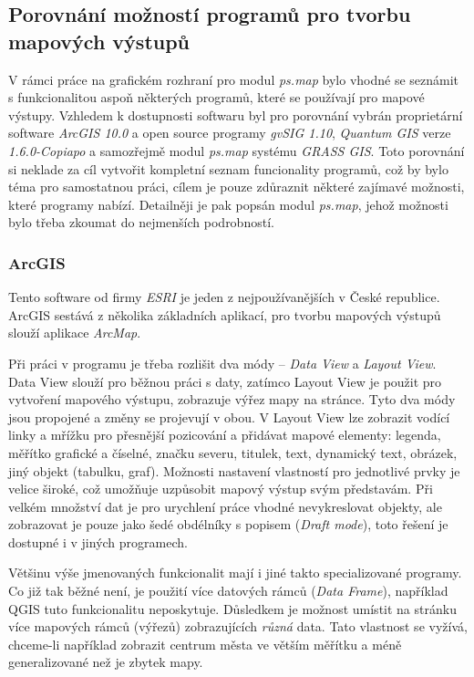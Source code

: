 \documentclass[a4paper,12pt,draft]{article}
\newcommand{\modul}[1]{\emph{#1}}
\begin{document}
\subsection{Porovnání možností programů pro tvorbu mapových výstupů}
V rámci práce na grafickém rozhraní pro modul \modul{ps.map} bylo vhodné se seznámit s funkcionalitou aspoň některých programů, které se používají pro mapové výstupy. Vzhledem k dostupnosti softwaru byl pro porovnání vybrán proprietární software \emph{ArcGIS 10.0} a
open source programy \emph{gvSIG 1.10}, \emph{Quantum GIS} verze \emph{1.6.0-Copiapo} a samozřejmě modul \modul{ps.map} systému \emph{GRASS GIS}.
Toto porovnání si neklade za cíl vytvořit kompletní seznam funcionality programů, což by bylo téma pro samostatnou práci, cílem je pouze zdůraznit některé zajímavé možnosti, které programy nabízí. Detailněji je pak popsán modul \modul{ps.map}, jehož možnosti bylo třeba zkoumat do nejmenších podrobností.

\subsubsection{ArcGIS}
Tento software od firmy \emph{ESRI} je jeden z nejpoužívanějších v České republice. ArcGIS sestává z několika základních aplikací,  pro tvorbu mapových výstupů slouží aplikace \emph{ArcMap}.

Při práci v programu je třeba rozlišit dva módy -- \emph{Data View} a \emph{Layout View}. Data View slouží pro běžnou práci s daty, zatímco Layout View je použit pro vytvoření mapového výstupu, zobrazuje výřez mapy na stránce. Tyto dva módy jsou propojené a změny se projevují v obou. V Layout View lze zobrazit vodící linky a mřížku pro přesnější pozicování  a  přidávat mapové elementy: legenda, měřítko grafické a číselné, značku severu, titulek, text, dynamický text, obrázek, jiný objekt (tabulku, graf).  Možnosti nastavení vlastností pro jednotlivé prvky je velice široké, což umožňuje uzpůsobit mapový výstup svým představám. Při velkém množství dat je pro urychlení práce vhodné nevykreslovat objekty, ale zobrazovat je pouze jako šedé obdélníky s popisem (\emph{Draft mode}), toto řešení je dostupné i v jiných programech. 

Většinu výše jmenovaných funkcionalit mají i jiné takto specializované programy. Co již tak běžné není, je použití více datových rámců (\emph{Data Frame}), například QGIS tuto funkcionalitu neposkytuje. Důsledkem je možnost umístit na stránku více mapových rámců (výřezů) zobrazujících \emph{různá} data. Tato vlastnost se vyžívá, chceme-li například zobrazit centrum města ve větším měřítku a méně generalizované než je zbytek mapy. 
\end{document}
